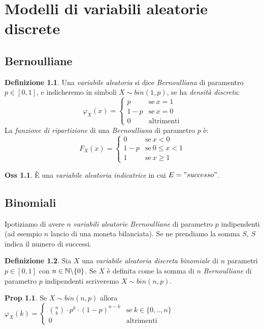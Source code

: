 \documentclass[12pt, a4paper]{report}
\theoremstyle{definition}
\newtheorem{definition}{Definizione}[section]
\newtheorem*{proposition}{Prop}
\newtheorem*{observation}{Oss}
\DeclareRobustCommand{\N}{\mathbb{N}}%
\begin{document}
\chapter{Modelli di variabili aleatorie discrete}

\section{Bernoulliane}
\begin{definition}
	Una \emph{variabile aleatoria} si dice \emph{Bernoulliana} di paramentro
	$p\in[0,1]$, e indicheremo in simboli \(X\sim bin(1,p)\), se ha
	\emph{densità discreta}:
	\[\varphi_X(x)=\begin{cases}
		{p} & \text{se}\ {x=1}\\
		{1-p} & \text{se}\ {x=0}\\
		{0} & \text{altrimenti}
	\end{cases}\]
	La \emph{funzione di ripartizione} di una \emph{Bernoulliana} di parametro
	$p$	è:
	\[F_X(x)=\begin{cases}
		{0} & \text{se}\ {x<0}\\
		{1-p} & \text{se}\ {0\leq x<1}\\
		{1} & \text{se}\ {x\geq 1}
	\end{cases}\]
\end{definition}
\begin{observation}
	È una \emph{variabile aleatoria indicatrice} in cui $E="successo"$.
\end{observation}

\section{Binomiali}
Ipotiziamo di avere $n$ \emph{variabili aleatorie Bernoulliane} di parametro $p$
indipendenti (ad esempio $n$ lancio di una moneta bilanciata). Se ne prendiamo
la somma $S$, $S$ indica il numero di successi.

\begin{definition}
	Sia $X$ una \emph{variabile aleatoria discreta binomiale} di $n$ parametri
	$p\in[0,1]$ con \(n\in\N\symbol{92}\{0\}\). Se $X$ è definita come la somma
	di $n$ \emph{Bernoulliane} di parametro $p$ indipendenti scriveremo \(X\sim
	bin(n,p)\).
\end{definition}
\begin{proposition}
	Se \(X\sim bin(n,p)\) allora \(\varphi_X(k)=\begin{cases}
		{\binom{n}{k}\cdot p^k\cdot (1-p)^{n-k}} & \text{se}\ {k\in\{0,..,n\}}\\
		{0} & \text{altrimenti}
	\end{cases}\)
\end{proposition}
\end{document}
